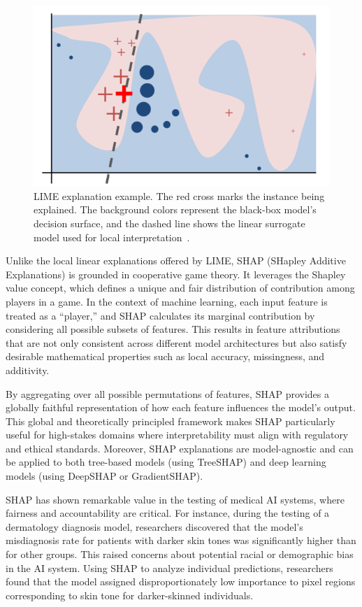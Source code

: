 \documentclass[manuscript,screen,review]{acmart}
\begin{document}
\begin{figure}[htbp]
  \centering
  \includegraphics[width=0.6\linewidth]{picture/5.2fig1.png}
  \caption{LIME explanation example. The red cross marks the instance being explained. The background colors represent the black-box model’s decision surface, and the dashed line shows the linear surrogate model used for local interpretation~\cite{Ribeiro2016}.}
  \label{fig:lime}
\end{figure}

Unlike the local linear explanations offered by LIME, SHAP (SHapley Additive Explanations) is grounded in cooperative game theory. It leverages the Shapley value concept, which defines a unique and fair distribution of contribution among players in a game. In the context of machine learning, each input feature is treated as a ``player,'' and SHAP calculates its marginal contribution by considering all possible subsets of features. This results in feature attributions that are not only consistent across different model architectures but also satisfy desirable mathematical properties such as local accuracy, missingness, and additivity.

By aggregating over all possible permutations of features, SHAP provides a globally faithful representation of how each feature influences the model’s output. This global and theoretically principled framework makes SHAP particularly useful for high-stakes domains where interpretability must align with regulatory and ethical standards. Moreover, SHAP explanations are model-agnostic and can be applied to both tree-based models (using TreeSHAP) and deep learning models (using DeepSHAP or GradientSHAP).

SHAP has shown remarkable value in the testing of medical AI systems, where fairness and accountability are critical. For instance, during the testing of a dermatology diagnosis model, researchers discovered that the model’s misdiagnosis rate for patients with darker skin tones was significantly higher than for other groups. This raised concerns about potential racial or demographic bias in the AI system. Using SHAP to analyze individual predictions, researchers found that the model assigned disproportionately low importance to pixel regions corresponding to skin tone for darker-skinned individuals.
\end{document}
